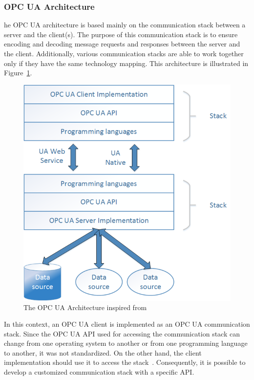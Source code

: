 \subsubsection{OPC UA Architecture }
he OPC UA architecture is based mainly on the communication stack between a server and the client(s). The purpose of this communication stack is to ensure encoding and decoding message requests and responses between the server and the client. Additionally, various communication stacks are able to work together only if they have the same technology mapping. This architecture is illustrated in Figure~\ref{fig:contrib2:ua}.\par
\begin{figure}[htbp]
    \centering
    \includegraphics[width=.7\textwidth]{resources/images/OPCUA}
    \caption{The OPC UA Architecture inspired from~\cite{ua2}}\label{fig:contrib2:ua}
\end{figure}

In this context, an OPC UA client is implemented as an OPC UA communication stack. Since the OPC UA API used for accessing the communication stack can change from one operating system to another or from one programming language to another, it was not standardized. On the other hand, the client implementation should use it to access the stack~\cite{ua2}. Consequently, it is possible to develop a customized communication stack with a specific API.  \par

